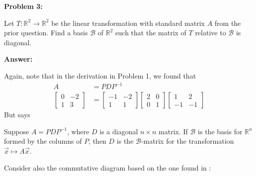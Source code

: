 \documentclass[10pt,letterpaper,final]{report}
\newcommand{\R}{\mathbb{R}}
\begin{document}
\pagebreak

\noindent\textbf{Problem 3:}
\medskip

Let $T : \R^2 \to \R^2$ be the linear transformation with standard matrix $A$ from the prior question. Find a basis $\mathcal{B}$ of $\R^2$ such that the matrix of $T$ relative to $\mathcal{B}$ is diagonal.

\medskip
\noindent\textbf{Answer:}

Again, note that in the derivation in Problem 1, we found that
\begin{align*}
  A                 & = PDP^{-1}                               \\[1ex]
  \begin{bmatrix}
    0 & -2 \\
    1 & 3
  \end{bmatrix} & = \begin{bmatrix}
                      -1 & -2 \\
                      1  & 1
                    \end{bmatrix}\begin{bmatrix}
                                   2 & 0 \\
                                   0 & 1
                                 \end{bmatrix}\begin{bmatrix}
                                                1  & 2  \\
                                                -1 & -1
                                              \end{bmatrix}
\end{align*}
But \textcite[Theorem~5.8, p.~300]{LayEtAl2020LinearAlgebraAndItsApplications} says

\begin{tcolorbox}[colback=blue!10!white, colframe=blue!10!black, title={Theorem 5.8 - Diagonal Matrix Representation}]
  Suppose $A = PDP^{-1}$, where $D$ is a diagonal $n \times n$ matrix. If $\mathcal{B}$ is the basis for $\R^n$ formed by the columns of $P$, then $D$ is the $\mathcal{B}$-matrix for the transformation $\vec{x} \mapsto A\vec{x}$.
\end{tcolorbox}

Consider also the commutative diagram based on the one found in \textcite[Ch.~5.4, p.~301]{LayEtAl2020LinearAlgebraAndItsApplications}:
\end{document}
